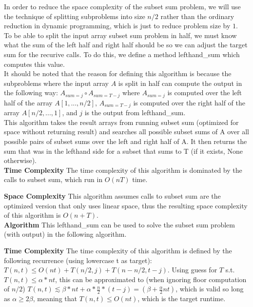 \documentclass[11pt]{article}
\begin{document}



\begin{solution}
In order to reduce the space complexity of the subset sum problem, we will use the technique of splitting subproblems into size $n/2$ rather than the ordinary reduction in dynamic programming, which is just to reduce problem size by $1$. \\
To be able to split the input array subset sum problem in half, we must know what the sum of the left half and right half should be so we can adjust the target sum for the recurive calls. To do this, we define a method lefthand\_sum which computes this value. \\
It should be noted that the reason for defining this algorithm is because the subproblems where the input array $A$ is split in half can compute the output in the following way: $A_{sum = j} \circ A_{sum = T - j}$ where $A_{sum = j}$ is computed over the left half of the array $A[1,...,n/2]$, $A_{sum = T - j}$ is computed over the right half of the array $A[n/2,...,1]$, and $j$ is the output from lefthand\_sum. \\



This algorithm takes the result arrays from running subset sum (optimized for space without returning result) and searches all possible subset sums of A over all possible pairs of subset sums over the left and right half of A. It then returns the sum that was in the lefthand side for a subset that sums to T (if it exists, None otherwise). \\

\textbf{Time Complexity}
The time complexity of this algorithm is dominated by the calls to subset sum, which run in $O(nT)$ time.

\textbf{Space Complexity}
This algorithm assumes calls to subset sum are the optimized version that only uses linear space, thus the resulting space complexity of this algorithm is $O(n + T)$. \\

\textbf{Algorithm}
This lefthand\_sum can be used to solve the subset sum problem (with output) in the following algorithm.



\textbf{Time Complexity}
The time complexity of this algorithm is defined by the following recurrence (using lowercase t as target): $T(n,t) \leq O(nt) + T(n/2, j) + T(n - n/2, t - j)$. Using guess for $T$ s.t. $T(n,t) \leq \alpha * nt$, this can be approximated to (when ignoring floor computation of $n/2$) $T(n,t) \lesssim \beta * nt + \alpha * \frac{n}{2} * (t - j) = (\beta + \frac{\alpha}{2}nt)$, which is valid so long as $\alpha \geq 2 \beta$, meaning that $T(n,t) \leq O(nt)$, which is the target runtime.


\end{solution}
\end{document}
